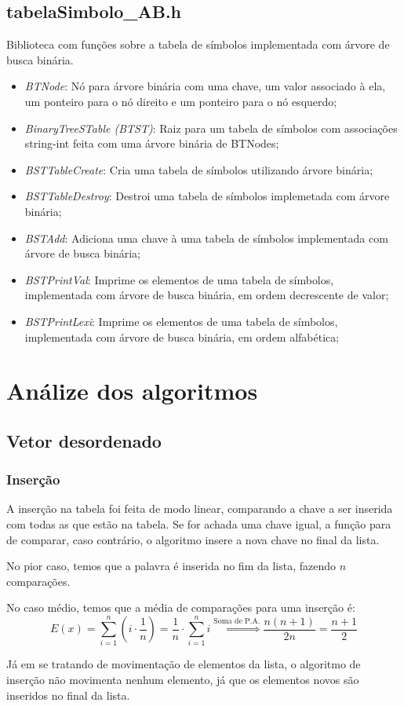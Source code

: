 \documentclass[12pt, a4paper]{article} %
\begin{document}
	\subsection{tabelaSimbolo\_AB.h}
	Biblioteca com funções sobre a tabela de símbolos implementada com árvore de busca binária.
	\begin{itemize}
		\item \textit{BTNode}: Nó para árvore binária com uma chave, um valor associado à ela, um ponteiro para o nó direito e um ponteiro para o nó esquerdo;
		\item \textit{BinaryTreeSTable (BTST)}: Raiz para um tabela de símbolos com associações string-int feita com uma árvore binária de BTNodes;
		\item \textit{BSTTableCreate}:  Cria uma tabela de símbolos utilizando árvore binária;
		\item \textit{BSTTableDestroy}: Destroi uma tabela de símbolos implemetada com árvore binária;
		\item \textit{BSTAdd}: Adiciona uma chave à uma tabela de símbolos implementada com árvore de busca binária;
		\item \textit{BSTPrintVal}: Imprime os elementos de uma tabela de símbolos, implementada com árvore de busca binária, em ordem decrescente de valor;
		\item \textit{BSTPrintLexi}: Imprime os elementos de uma tabela de símbolos, implementada com árvore de busca binária, em ordem alfabética; 
	\end{itemize}
\section{Análize dos algoritmos}
	\subsection{Vetor desordenado}
		\subsubsection{Inserção}
		\par A inserção na tabela foi feita de modo linear, comparando a chave a ser inserida com todas as que estão na tabela. Se for achada uma chave igual, a função para de comparar, caso contrário, o algoritmo insere a nova chave no final da lista.
		\par No pior caso, temos que a palavra é inserida no fim da lista, fazendo $n$ comparações.
		\par No caso médio, temos que a média de comparações para uma inserção é:
		\begin{equation}
		E(x) = \sum^n_{i=1}\left(i\cdot \frac{1}{n}\right) = \frac{1}{n}\cdot\sum^n_{i=1}i \stackrel{\text{Soma de P.A.}}{\Longrightarrow} \frac{n(n+1)}{2n} = \frac{n+1}{2}
		\end{equation}
		\par Já em se tratando de movimentação de elementos da lista, o algoritmo de inserção não movimenta nenhum elemento, já que os elementos novos são inseridos no final da lista.
\end{document}

